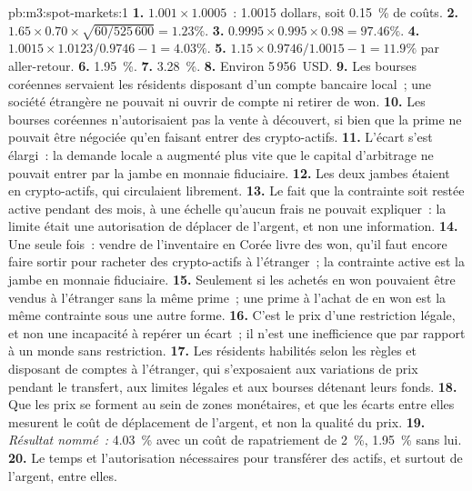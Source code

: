 \begin{solution}{pb:m3:spot-markets:1}
\textbf{1.} $1.001 \times 1.0005$~: 1.0015 dollars, soit 0.15~\% de coûts. \textbf{2.} $1.65 \times 0.70 \times
\sqrt{60/525\,600} = 1.23\%$. \textbf{3.} $0.9995 \times 0.995 \times 0.98 = 97.46\%$. \textbf{4.} $1.0015
\times 1.0123/0.9746 - 1 = 4.03\%$. \textbf{5.} $1.15 \times 0.9746/1.0015 - 1 = 11.9\%$ par aller-retour.
\textbf{6.} 1.95~\%. \textbf{7.} 3.28~\%. \textbf{8.} Environ 5\,956~USD. \textbf{9.} Les bourses coréennes servaient les résidents
disposant d'un compte bancaire local~; une société étrangère ne pouvait ni ouvrir de compte ni retirer de won. \textbf{10.} Les bourses coréennes
n'autorisaient pas la vente à découvert, si bien que la prime ne pouvait être négociée qu'en faisant entrer des crypto-actifs. \textbf{11.} L'écart s'est élargi~: la demande locale a augmenté
plus vite que le capital d'arbitrage ne pouvait entrer par la jambe en monnaie fiduciaire. \textbf{12.} Les deux jambes étaient en crypto-actifs, qui circulaient
librement. \textbf{13.} Le fait que la contrainte soit restée active pendant des mois, à une échelle qu'aucun frais ne pouvait expliquer~: la limite était
une autorisation de déplacer de l'argent, et non une information. \textbf{14.} Une seule fois~: vendre de l'inventaire en Corée livre des won, qu'il faut encore
faire sortir pour racheter des crypto-actifs à l'étranger~; la contrainte active est la jambe en monnaie fiduciaire. \textbf{15.} Seulement si les 
achetés en won pouvaient être vendus à l'étranger sans la même prime~; une prime à l'achat de  en won est la même
contrainte sous une autre forme. \textbf{16.} C'est le prix d'une restriction légale, et non une incapacité à repérer un écart~; il
n'est une inefficience que par rapport à un monde sans restriction. \textbf{17.} Les résidents habilités selon les règles
et disposant de comptes à l'étranger, qui s'exposaient aux variations de prix pendant le transfert, aux limites légales et aux bourses détenant
leurs fonds. \textbf{18.} Que les prix se forment au sein de zones monétaires, et que les écarts entre elles mesurent le coût
de déplacement de l'argent, et non la qualité du prix. \textbf{19.} \emph{Résultat nommé~:} 4.03~\% avec un coût de rapatriement de 2~\%,
1.95~\% sans lui. \textbf{20.} Le temps et l'autorisation nécessaires pour transférer des actifs, et surtout de l'argent, entre
elles.
\end{solution}

